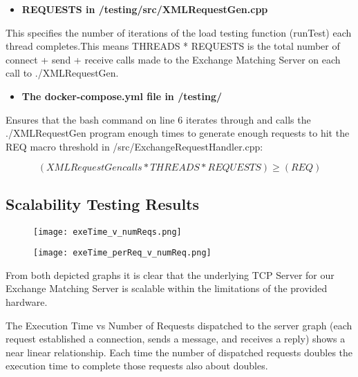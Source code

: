 \documentclass[letterpaper, 10 pt, conference]{ieeeconf}
\begin{document}
\begin{itemize}
\item \textbf{REQUESTS in /testing/src/XMLRequestGen.cpp}
\end{itemize}
 
 
 
This specifies the number of iterations of the 
load testing function (runTest) each thread
completes.This means THREADS * REQUESTS is the
total number of connect + send + receive calls 
made to the Exchange Matching Server on each call to ./XMLRequestGen.




\begin{itemize}
\item \textbf{The docker-compose.yml file in /testing/}
\end{itemize}
Ensures that the bash command on line 6
iterates through and calls the ./XMLRequestGen
program enough times to generate enough
requests to hit the REQ macro threshold
in /src/ExchangeRequestHandler.cpp:
    
    
   
   \[ (XMLRequestGen calls * THREADS 
   *REQUESTS)
   \geq (REQ)  
    \] 
    


\subsection{Scalability Testing Results}

\begin{figure}[!htb]
    \centering
    \texttt{[image: exeTime\_v\_numReqs.png]}
    \label{fig:my_label}
\end{figure}


\begin{figure}[!htb]
    \centering
    \texttt{[image: exeTime\_perReq\_v\_numReq.png]}
    \label{fig:my_label}
\end{figure}

From both depicted graphs it is clear that the underlying TCP Server for
our Exchange Matching Server is scalable within the limitations of the 
provided hardware.

The Execution Time vs Number of Requests dispatched to the server graph
(each request established a connection, sends a message, and receives a
reply) shows a near linear relationship. Each time the number of
dispatched requests doubles the execution time to complete those requests
also about doubles.
\end{document}
